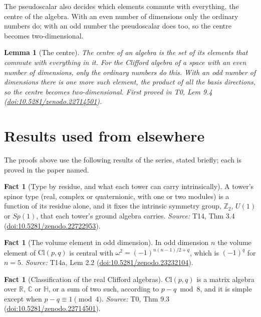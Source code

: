\documentclass[11pt]{article}
\newtheorem{lemma}[theorem]{Lemma}
\theoremstyle{definition}
\newtheorem{fact}[theorem]{Fact}
\theoremstyle{plain}
\providecommand{\C}{}\renewcommand{\C}{\mathbb{C}}
\providecommand{\Cl}{}\renewcommand{\Cl}{\mathrm{Cl}}
\providecommand{\HH}{}\renewcommand{\HH}{\mathbb{H}}
\providecommand{\R}{}\renewcommand{\R}{\mathbb{R}}
\providecommand{\Z}{}\renewcommand{\Z}{\mathbb{Z}}
\begin{document}
The pseudoscalar also decides which elements commute with everything, the centre of the algebra. With an even number of dimensions only the ordinary numbers do; with an odd number the pseudoscalar does too, so the centre becomes two-dimensional.

\begin{lemma}[The centre]\label{c:primer.centre}
The centre of an algebra is the set of its elements that commute with everything in it. For the Clifford algebra of a space with an even number of dimensions, only the ordinary numbers do this. With an odd number of dimensions there is one more such element, the product of all the basis directions, so the centre becomes two-dimensional.
\emph{First proved in} T0, Lem 9.4 (\href{https://doi.org/10.5281/zenodo.22714501}{doi:10.5281/zenodo.22714501}).
\end{lemma}

\section{Results used from elsewhere}
The proofs above use the following results of the series, stated briefly; each is proved in the paper named.

\begin{fact}[Type by residue, and what each tower can carry intrinsically]\label{c:dark-matter.type-residue-what-each-tower-can}
A tower's spinor type (real, complex or quaternionic, with one or two modules) is a function of its residue alone, and it fixes the intrinsic symmetry group, $\Z_{2}$, $U(1)$ or $Sp(1)$, that each tower's ground algebra carries.
\emph{Source:} T14, Thm 3.4 (\href{https://doi.org/10.5281/zenodo.22722953}{doi:10.5281/zenodo.22722953}).
\end{fact}

\begin{fact}[The volume element in odd dimension]\label{c:odd-extensions.volume-element-odd-dimension}
In odd dimension $n$ the volume element of $\Cl(p,q)$ is central with $\omega^{2} = (-1)^{n(n-1)/2 + q}$, which is $(-1)^{q}$ for $n = 5$.
\emph{Source:} T14a, Lem 2.2 (\href{https://doi.org/10.5281/zenodo.23232104}{doi:10.5281/zenodo.23232104}).
\end{fact}

\begin{fact}[Classification of the real Clifford algebras]\label{c:primer.classification-real-clifford-algebras}
$\Cl(p,q)$ is a matrix algebra over $\R$, $\C$ or $\HH$, or a sum of two such, according to $p - q \bmod 8$, and it is simple except when $p - q \equiv 1 \pmod 4$.
\emph{Source:} T0, Thm 9.3 (\href{https://doi.org/10.5281/zenodo.22714501}{doi:10.5281/zenodo.22714501}).
\end{fact}
\end{document}

